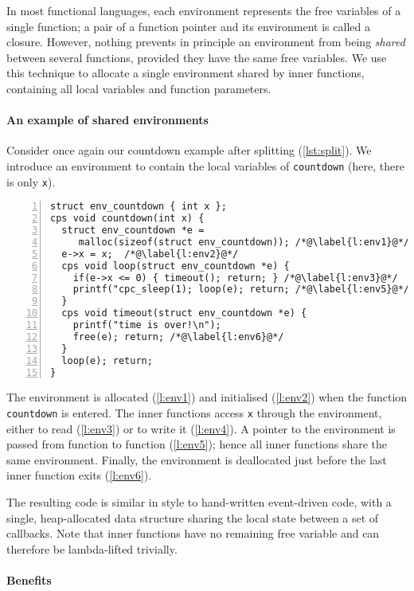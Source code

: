 \documentclass[a4paper]{llncs}
\begin{document}
In most functional languages, each environment represents the free variables of a
single function; a pair of a function pointer and its environment is called a
closure.  However, nothing prevents in principle an environment from being
\emph{shared} between several functions, provided they have the same free
variables.  We use this technique to allocate a single environment shared by
inner functions, containing all local variables and function parameters.

\paragraph{An example of shared environments}

Consider once again our countdown example after splitting (\cref{lst:split}).
We introduce an environment to contain the local variables of \texttt{countdown}
(here, there is only \texttt{x}).
\begin{lstlisting}[numbers=left]
struct env_countdown { int x };
cps void countdown(int x) {
  struct env_countdown *e =
     malloc(sizeof(struct env_countdown)); /*@\label{l:env1}@*/
  e->x = x;  /*@\label{l:env2}@*/
  cps void loop(struct env_countdown *e) {
    if(e->x <= 0) { timeout(); return; } /*@\label{l:env3}@*/
    printf("cpc_sleep(1); loop(e); return; /*@\label{l:env5}@*/
  }
  cps void timeout(struct env_countdown *e) {
    printf("time is over!\n");
    free(e); return; /*@\label{l:env6}@*/
  }
  loop(e); return;
}
\end{lstlisting}
The environment is allocated (\cref{l:env1}) and initialised (\cref{l:env2})
when the function \texttt{countdown} is entered.  The inner functions access
\texttt{x} through the environment, either to read (\cref{l:env3}) or to write it
(\cref{l:env4}).  A pointer to the environment is passed from function to
function (\cref{l:env5}); hence all inner functions share the same environment.
Finally, the environment is deallocated just before the last inner function
exits (\cref{l:env6}).

The resulting code is similar in style to hand-written event-driven code, with a
single, heap-allocated data structure sharing the local state between a set of
callbacks.  Note that inner functions have no remaining free variable and can
therefore be lambda-lifted trivially.

\paragraph{Benefits}
\end{document}
